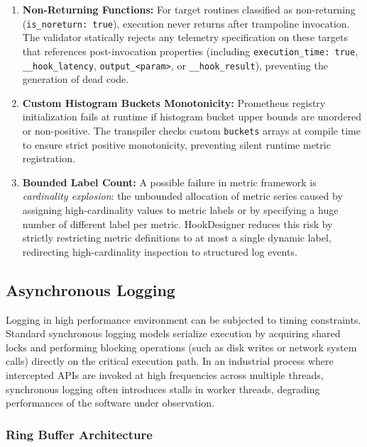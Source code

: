 \begin{enumerate}
	\item \textbf{Non-Returning Functions:}
	For target routines classified as non-returning (\texttt{is\_noreturn: true}), execution never returns after trampoline invocation.
	The validator statically rejects any telemetry specification on these targets that references post-invocation properties (including \texttt{execution\_time: true}, \texttt{\_\_hook\_latency}, \texttt{output\_<param>}, or \texttt{\_\_hook\_result}), preventing the generation of dead code.
	
	\item \textbf{Custom Histogram Buckets Monotonicity:}
	Prometheus registry initialization fails at runtime if histogram bucket upper bounds are unordered or non-positive.
	The transpiler checks custom \texttt{buckets} arrays at compile time to ensure strict positive monotonicity, preventing silent runtime metric registration.
	
	\item \textbf{Bounded Label Count:}
	A possible failure in metric framework is \emph{cardinality explosion}: the unbounded allocation of metric series caused by assigning high-cardinality values to metric labels or by specifying a huge number of different label per metric.
	HookDesigner reduces this risk by strictly restricting metric definitions to at most a single dynamic label, redirecting high-cardinality inspection to structured log events.
\end{enumerate}

\subsection{Asynchronous Logging}
\label{subsec:async_logging}

Logging in high performance environment can be subjected to timing constraints.
Standard synchronous logging models serialize execution by acquiring shared locks and performing blocking operations (such as disk writes or network system calls) directly on the critical execution path.
In an industrial process where intercepted APIs are invoked at high frequencies across multiple threads, synchronous logging often introduces stalls in worker threads, degrading performances of the software under observation.

\subsubsection{Ring Buffer Architecture}

